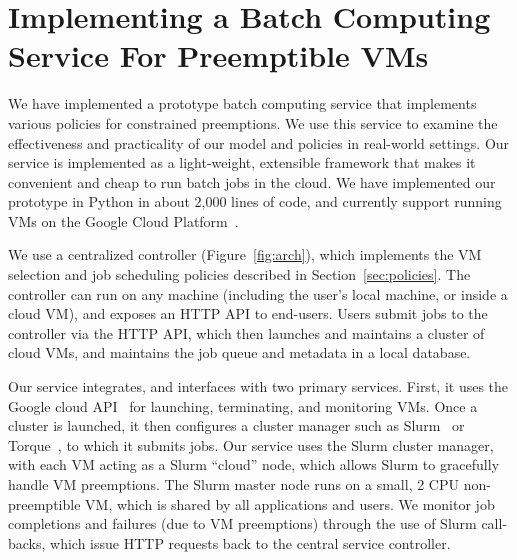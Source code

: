 \section{Implementing a Batch Computing Service For Preemptible VMs}
\label{sec:impl}

We have implemented a prototype batch computing service that implements various policies for constrained preemptions. 
We use this service to examine the effectiveness and practicality of our model and policies in real-world settings. 
%
Our service is implemented as a light-weight, extensible framework that makes it convenient and cheap to run batch jobs in the cloud. 
We have implemented our prototype in Python in about 2,000 lines of code, and currently support running VMs on the Google Cloud Platform~\cite{gcp}. 
%


We use a centralized controller (Figure~\ref{fig:arch}), which implements the VM selection and job scheduling policies described in Section~\ref{sec:policies}. 
The controller can run on any machine (including the user's local machine, or inside a cloud VM), and exposes an HTTP API to end-users. 
Users submit jobs to the controller via the HTTP API, which then launches and maintains a cluster of cloud VMs, and maintains the job queue and metadata in a local database. 

Our service integrates, and interfaces with two primary services.
First, it uses the Google cloud API~\cite{gcloud-api} for launching, terminating, and monitoring VMs.
Once a cluster is launched, it then configures a cluster manager such as Slurm~\cite{slurm} or Torque~\cite{torque}, to which it submits jobs. 
Our service uses the Slurm cluster manager, with each VM acting as a Slurm ``cloud'' node, which allows Slurm to gracefully handle VM preemptions.
The Slurm master node runs on a small, 2 CPU non-preemptible VM, which is shared by all applications and users. 
We monitor job completions and failures (due to VM preemptions) through the use of Slurm call-backs, which issue HTTP requests back to the central service controller. 

